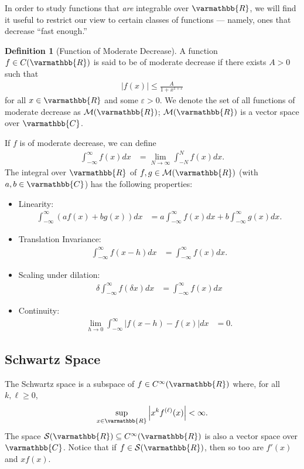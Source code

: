 \documentclass[12pt]{extarticle}
\newcommand{\R}{\varmathbb{R}}
\newcommand{\C}{\varmathbb{C}}
\theoremstyle{plain}
\theoremstyle{definition}
\newtheorem*{definition}{Definition}
\theoremstyle{remark}
\renewcommand{\newline}{\hfill\break}
\begin{document}
  In order to study functions that \textit{are} integrable over $\R$, we will find it useful to restrict our view to certain classes of functions --- namely, ones that decrease ``fast enough.''
  \begin{definition}[Function of Moderate Decrease]
    A function $f\in C(\R)$ is said to be of moderate decrease if there exists $A > 0$ such that
    \begin{align*}
      |f(x)| \leq \frac{A}{1 + x^{1 + \varepsilon}}
    \end{align*}
    for all $x\in \R$ and some $\varepsilon > 0$. We denote the set of all functions of moderate decrease as $\mathcal{M}(\R)$; $\mathcal{M}(\R)$ is a vector space over $\C$.
  \end{definition}
  If $f$ is of moderate decrease, we can define
  \begin{align*}
    \int_{-\infty}^{\infty}f(x)dx &= \lim_{N\rightarrow\infty}\int_{-N}^{N}f(x)dx.
  \end{align*}
  The integral over $\R$ of $f,g\in \mathcal{M}(\R)$ (with $a,b\in \C$) has the following properties:
  \begin{itemize}
    \item Linearity:
      \begin{align*}
        \int_{-\infty}^{\infty}\left(af(x) + bg(x)\right) dx &= a\int_{-\infty}^{\infty}f(x)dx + b\int_{-\infty}^{\infty}g(x)dx.
      \end{align*}
    \item Translation Invariance:
      \begin{align*}
        \int_{-\infty}^{\infty}f(x-h)dx &= \int_{-\infty}^{\infty}f(x)dx.
      \end{align*}
    \item Scaling under dilation:
      \begin{align*}
        \delta\int_{-\infty}^{\infty}f(\delta x)dx &= \int_{-\infty}^{\infty}f(x)dx
      \end{align*}
    \item Continuity:
      \begin{align*}
        \lim_{h\rightarrow 0}\int_{-\infty}^{\infty}|f(x-h) - f(x)|dx &= 0.
      \end{align*}
  \end{itemize}
  \subsection{Schwartz Space}%
  The Schwartz space is a subspace of $f\in C^{\infty}(\R)$ where, for all $k,\ell \geq 0$,
  \begin{align*}
    \sup_{x\in \R}\left\vert x^{k}f^{(\ell)}(x) \right\vert < \infty.
  \end{align*}
  The space $\mathcal{S}(\R)\subseteq C^{\infty}(\R)$ is also a vector space over $\C$. Notice that if $f\in \mathcal{S}(\R)$, then so too are $f'(x)$ and $xf(x)$.\newline
\end{document}
